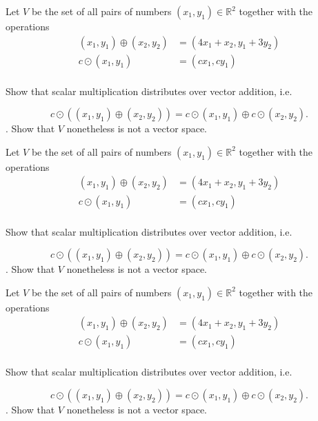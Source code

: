 \documentclass{article}
\begin{document}
\begin{exerciseStatement}
    Let \(V\) be the set of all pairs of numbers \((x_1,y_1)\in\mathbb{R}^2\)  together with the operations
\begin{align*}
(x_1,y_1)\oplus (x_2,y_2)&= (4x_1+x_2, y_1+3y_2)\\
c \odot (x_1,y_1) &= (cx_1,cy_1)\\
\end{align*}

Show that scalar multiplication distributes over vector addition, i.e.

\[c\odot \left((x_1,y_1)\oplus(x_2,y_2)\right)=c\odot(x_1,y_1)\oplus c\odot(x_2,y_2).\]
.
Show that \(V\) nonetheless is not a vector space.



  
\end{exerciseStatement}

\begin{exerciseStatement}
    Let \(V\) be the set of all pairs of numbers \((x_1,y_1)\in\mathbb{R}^2\)  together with the operations
\begin{align*}
(x_1,y_1)\oplus (x_2,y_2)&= (4x_1+x_2, y_1+3y_2)\\
c \odot (x_1,y_1) &= (cx_1,cy_1)\\
\end{align*}

Show that scalar multiplication distributes over vector addition, i.e.

\[c\odot \left((x_1,y_1)\oplus(x_2,y_2)\right)=c\odot(x_1,y_1)\oplus c\odot(x_2,y_2).\]
.
Show that \(V\) nonetheless is not a vector space.



  
\end{exerciseStatement}

\begin{exerciseStatement}
    Let \(V\) be the set of all pairs of numbers \((x_1,y_1)\in\mathbb{R}^2\)  together with the operations
\begin{align*}
(x_1,y_1)\oplus (x_2,y_2)&= (4x_1+x_2, y_1+3y_2)\\
c \odot (x_1,y_1) &= (cx_1,cy_1)\\
\end{align*}

Show that scalar multiplication distributes over vector addition, i.e.

\[c\odot \left((x_1,y_1)\oplus(x_2,y_2)\right)=c\odot(x_1,y_1)\oplus c\odot(x_2,y_2).\]
.
Show that \(V\) nonetheless is not a vector space.



  
\end{exerciseStatement}
\end{document}
